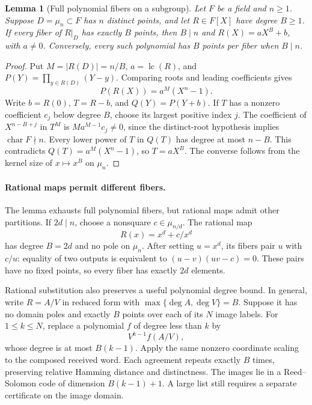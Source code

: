 \documentclass[11pt,letterpaper]{article}
\newtheorem{lemma}[theorem]{Lemma}
\theoremstyle{definition}
\theoremstyle{remark}
\begin{document}
\begin{lemma}[Full polynomial fibers on a subgroup]
\label{lem:balanced-polynomial-fibers}
Let $F$ be a field and $n\ge1$. Suppose $D=\mu_n\subset F$ has
$n$ distinct points, and let
$R\in F[X]$ have degree $B\ge1$. If every fiber of $R|_D$ has
exactly $B$ points, then $B\mid n$ and $R(X)=aX^B+b$, with
$a\ne0$. Conversely, every such polynomial has $B$ points per
fiber when $B\mid n$.
\end{lemma}
\begin{proof}
Put $M=|R(D)|=n/B$, $a=\operatorname{lc}(R)$, and
$P(Y)=\prod_{y\in R(D)}(Y-y)$. Comparing roots and leading
coefficients gives
\[
 P(R(X))=a^M(X^n-1).
\]
Write $b=R(0)$, $T=R-b$, and $Q(Y)=P(Y+b)$. If $T$ has a
nonzero coefficient $c_j$ below degree $B$, choose its largest
positive index $j$. The coefficient of $X^{n-B+j}$ in $T^M$
is $Ma^{M-1}c_j\ne0$, since the distinct-root hypothesis implies
$\operatorname{char}F\nmid n$. Every lower power of $T$ in
$Q(T)$ has degree at most $n-B$. This contradicts
$Q(T)=a^M(X^n-1)$, so $T=aX^B$. The converse follows from the
kernel size of $x\mapsto x^B$ on $\mu_n$.
\end{proof}

\paragraph{Rational maps permit different fibers.}
The lemma exhausts full polynomial fibers, but rational maps admit
other partitions. If $2d\mid n$, choose a nonsquare
$c\in\mu_{n/d}$. The rational map
\[
 R(x)=x^d+c/x^d
\]
has degree $B=2d$ and no pole on $\mu_n$. After setting $u=x^d$,
its fibers pair $u$ with $c/u$: equality of two outputs is equivalent
to $(u-v)(uv-c)=0$. These pairs have no fixed points, so every fiber
has exactly $2d$ elements.

Rational substitution also preserves a useful polynomial degree bound.
In general, write $R=A/V$ in reduced form with
$\max\{\deg A,\deg V\}=B$. Suppose it has no domain poles and
exactly $B$ points over each of its $N$ image labels. For
$1\le k\le N$, replace a polynomial $f$ of degree less than $k$ by
\[
 V^{k-1}f(A/V),
\]
whose degree is at most $B(k-1)$. Apply the same nonzero coordinate
scaling to the composed received word. Each agreement repeats exactly
$B$ times, preserving relative Hamming distance and distinctness.
The images lie in a Reed--Solomon code of dimension $B(k-1)+1$. A large list still
requires a separate certificate on the image domain.
\end{document}
